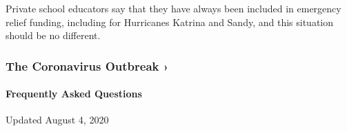 Private school educators say that they have always been included in
emergency relief funding, including for Hurricanes Katrina and Sandy,
and this situation should be no different.

\href{https://www.nytimes.com/news-event/coronavirus?action=click\&pgtype=Article\&state=default\&region=MAIN_CONTENT_3\&context=storylines_faq}{}

\hypertarget{the-coronavirus-outbreak-}{%
\subsubsection{The Coronavirus Outbreak
›}\label{the-coronavirus-outbreak-}}

\hypertarget{frequently-asked-questions}{%
\paragraph{Frequently Asked
Questions}\label{frequently-asked-questions}}

Updated August 4, 2020

